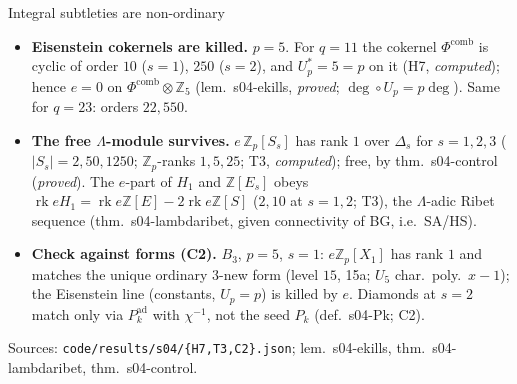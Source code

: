 \begin{frame}{Integral subtleties are non-ordinary}
  \footnotesize
  \begin{itemize}
    \item \textbf{Eisenstein cokernels are killed.} $p=5$. For $q=11$ the cokernel $\Phi^{\mathrm{comb}}$ is cyclic of order
      $10$ ($s=1$), $250$ ($s=2$), and $U_p^*=5=p$ on it (H7, \emph{computed}); hence $e=0$ on $\Phi^{\mathrm{comb}}\otimes\mathbb Z_5$
      (lem.\ s04-ekills, \emph{proved}; $\deg\circ U_p=p\deg$). Same for $q=23$: orders $22,550$.
    \item \textbf{The free $\Lambda$-module survives.} $e\,\mathbb Z_p[S_s]$ has rank $1$ over $\Delta_s$ for $s=1,2,3$
      ($|S_s|=2,50,1250$; $\mathbb Z_p$-ranks $1,5,25$; T3, \emph{computed}); free, by thm.\ s04-control (\emph{proved}).
      The $e$-part of $H_1$ and $\mathbb Z[E_s]$ obeys $\operatorname{rk} eH_1=\operatorname{rk}e\mathbb Z[E]-2\operatorname{rk}e\mathbb Z[S]$ ($2,10$ at $s=1,2$; T3), the \(\Lambda\)-adic Ribet sequence (thm.\ s04-lambdaribet, given connectivity of BG, i.e.\ SA/HS).
    \item \textbf{Check against forms (C2).} $B_3$, $p=5$, $s=1$: $e\mathbb Z_p[X_1]$ has rank $1$ and matches the unique
      ordinary $3$-new form (level $15$, 15a; $U_5$ char.\ poly.\ $x-1$); the Eisenstein line (constants, $U_p=p$) is killed by $e$.
      Diamonds at $s=2$ match only via $P^{\mathrm{ad}}_k$ with $\chi^{-1}$, not the seed $P_k$ (def.\ s04-Pk; C2).
  \end{itemize}
  \vfill
  {\tiny Sources: \texttt{code/results/s04/\{H7,T3,C2\}.json}; lem.\ s04-ekills, thm.\ s04-lambdaribet, thm.\ s04-control.}
\end{frame}
